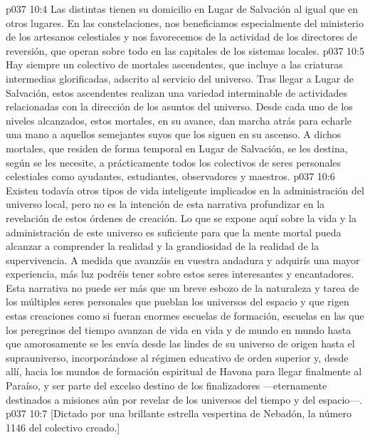 \vs p037 10:4 \pc Las distintas  tienen su domicilio en Lugar de Salvación al igual que en otros lugares. En las constelaciones, nos beneficiamos especialmente del ministerio de los artesanos celestiales y nos favorecemos de la actividad de los directores de reversión, que operan sobre todo en las capitales de los sistemas locales.
\vs p037 10:5 Hay siempre un colectivo de mortales ascendentes, que incluye a las criaturas intermedias glorificadas, adscrito al servicio del universo. Tras llegar a Lugar de Salvación, estos ascendentes realizan una variedad interminable de actividades relacionadas con la dirección de los asuntos del universo. Desde cada uno de los niveles alcanzados, estos mortales, en su avance, dan marcha atrás para echarle una mano a aquellos semejantes suyos que los siguen en su ascenso. A dichos mortales, que residen de forma temporal en Lugar de Salvación, se les destina, según se les necesite, a prácticamente todos los colectivos de seres personales celestiales como ayudantes, estudiantes, observadores y maestros.
\vs p037 10:6 Existen todavía otros tipos de vida inteligente implicados en la administración del universo local, pero no es la intención de esta narrativa profundizar en la revelación de estos órdenes de creación. Lo que se expone aquí sobre la vida y la administración de este universo es suficiente para que la mente mortal pueda alcanzar a comprender la realidad y la grandiosidad de la realidad de la supervivencia. A medida que avanzáis en vuestra andadura y adquirís una mayor experiencia, más luz podréis tener sobre estos seres interesantes y encantadores. Esta narrativa no puede ser más que un breve esbozo de la naturaleza y tarea de los múltiples seres personales que pueblan los universos del espacio y que rigen estas creaciones como si fueran enormes escuelas de formación, escuelas en las que los peregrinos del tiempo avanzan de vida en vida y de mundo en mundo hasta que amorosamente se les envía desde las lindes de su universo de origen hasta el suprauniverso, incorporándose al régimen educativo de orden superior y, desde allí, hacia los mundos de formación espiritual de Havona para llegar finalmente al Paraíso, y ser parte del excelso destino de los finalizadores ---eternamente destinados a misiones aún por revelar de los universos del tiempo y del espacio---.
\vsetoff
\vs p037 10:7 [Dictado por una brillante estrella vespertina de Nebadón, la número 1146 del colectivo creado.]
